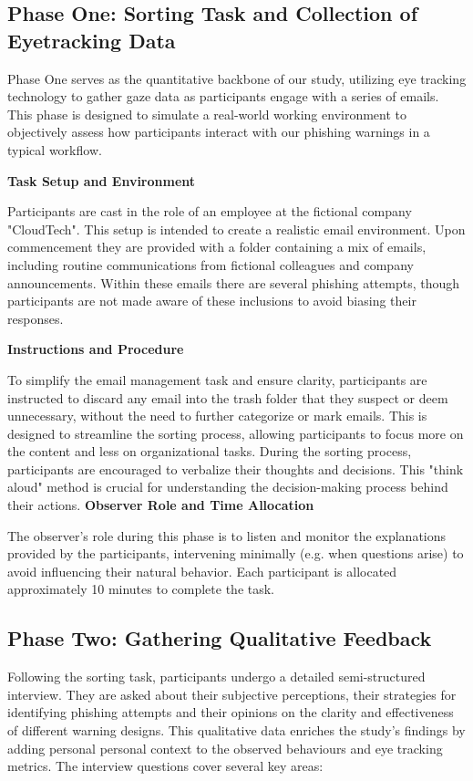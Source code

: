 \documentclass[
  a4paper,  %
  twoside,  %
  bibliography=totoc,
  headsepline,
  cleardoublepage=empty,
  parskip=half,
  draft=false
]{scrbook}
\begin{document}
\subsection{Phase One: Sorting Task and Collection of Eyetracking Data}

Phase One serves as the quantitative backbone of our study, utilizing eye tracking technology to gather gaze data as participants engage with a series of emails. This phase is designed to simulate a real-world working environment to objectively assess how participants interact with our phishing warnings in a typical workflow. 

\textbf{Task Setup and Environment}

Participants are cast in the role of an employee at the fictional company "CloudTech". This setup is intended to create a realistic email environment. Upon commencement they are provided with a folder containing a mix of emails, including routine communications from fictional colleagues and company announcements. Within these emails there are several phishing attempts, though participants are not made aware of these inclusions to avoid biasing their responses.  

\textbf{Instructions and Procedure}

To simplify the email management task and ensure clarity, participants are instructed to discard any email into the trash folder that they suspect or deem unnecessary, without the need to further categorize or mark emails. This is designed to streamline the sorting process, allowing participants to focus more on the content and less on organizational tasks. 
During the sorting process, participants are encouraged to verbalize their thoughts and decisions. This "think aloud" method is crucial for understanding the decision-making process behind their actions.
\newpage
\textbf{Observer Role and Time Allocation}

The observer's role during this phase is to listen and monitor the explanations provided by the participants, intervening minimally (e.g. when questions arise) to avoid influencing their natural behavior. Each participant is allocated approximately 10 minutes to complete the task.

\subsection{Phase Two: Gathering Qualitative Feedback}

Following the sorting task, participants undergo a detailed semi-structured interview. They are asked about their subjective perceptions, their strategies for identifying phishing attempts and their opinions on the clarity and effectiveness of different warning designs.
This qualitative data enriches the study’s findings by adding personal personal context to the observed behaviours and eye tracking metrics. The interview questions cover several key areas:
\end{document}
